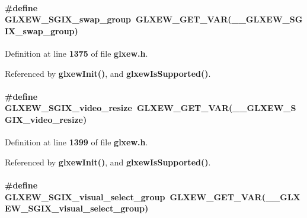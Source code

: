 \paragraph[{G\+L\+X\+E\+W\+\_\+\+S\+G\+I\+X\+\_\+swap\+\_\+group}]{\setlength{\rightskip}{0pt plus 5cm}\#define G\+L\+X\+E\+W\+\_\+\+S\+G\+I\+X\+\_\+swap\+\_\+group~{\bf G\+L\+X\+E\+W\+\_\+\+G\+E\+T\+\_\+\+V\+AR}({\bf \+\_\+\+\_\+\+G\+L\+X\+E\+W\+\_\+\+S\+G\+I\+X\+\_\+swap\+\_\+group})}\label{glxew_8h_a46eb6816358163bfd03967a707ea71c2}


Definition at line {\bf 1375} of file {\bf glxew.\+h}.



Referenced by {\bf glxew\+Init()}, and {\bf glxew\+Is\+Supported()}.

\paragraph[{G\+L\+X\+E\+W\+\_\+\+S\+G\+I\+X\+\_\+video\+\_\+resize}]{\setlength{\rightskip}{0pt plus 5cm}\#define G\+L\+X\+E\+W\+\_\+\+S\+G\+I\+X\+\_\+video\+\_\+resize~{\bf G\+L\+X\+E\+W\+\_\+\+G\+E\+T\+\_\+\+V\+AR}({\bf \+\_\+\+\_\+\+G\+L\+X\+E\+W\+\_\+\+S\+G\+I\+X\+\_\+video\+\_\+resize})}\label{glxew_8h_acaf6f02c4579ab73f2b22501a15135a0}


Definition at line {\bf 1399} of file {\bf glxew.\+h}.



Referenced by {\bf glxew\+Init()}, and {\bf glxew\+Is\+Supported()}.

\paragraph[{G\+L\+X\+E\+W\+\_\+\+S\+G\+I\+X\+\_\+visual\+\_\+select\+\_\+group}]{\setlength{\rightskip}{0pt plus 5cm}\#define G\+L\+X\+E\+W\+\_\+\+S\+G\+I\+X\+\_\+visual\+\_\+select\+\_\+group~{\bf G\+L\+X\+E\+W\+\_\+\+G\+E\+T\+\_\+\+V\+AR}({\bf \+\_\+\+\_\+\+G\+L\+X\+E\+W\+\_\+\+S\+G\+I\+X\+\_\+visual\+\_\+select\+\_\+group})}\label{glxew_8h_a3326d3c057aac1010f1df769f7370e90}


